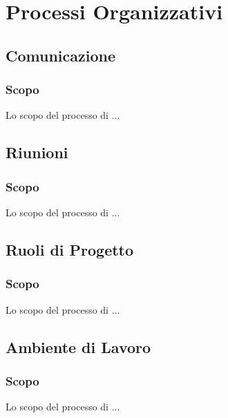 \section{Processi Organizzativi}


\subsection{Comunicazione}
\subsubsection{Scopo}
Lo scopo del processo di ...

\subsection{Riunioni}
\subsubsection{Scopo}
Lo scopo del processo di ...

\subsection{Ruoli di Progetto}
\subsubsection{Scopo}
Lo scopo del processo di ...

\subsection{Ambiente di Lavoro}
\subsubsection{Scopo}
Lo scopo del processo di ...